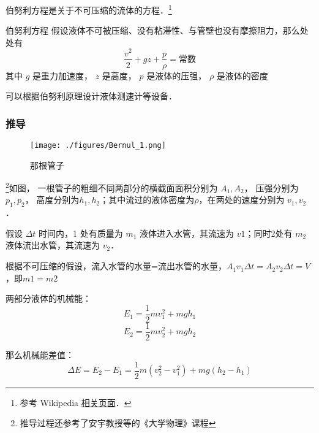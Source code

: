 

伯努利方程是关于不可压缩的流体的方程．\footnote{参考 Wikipedia \href{https://en.wikipedia.org/wiki/Bernoulli-principle}{相关页面}．}

\begin{theorem}{伯努利方程}
假设液体不可被压缩、没有粘滞性、与管壁也没有摩擦阻力，那么处处有
\begin{equation}
\frac{v^2}{2} + gz + \frac{p}{\rho} = \text{常数}
\end{equation}
其中 $g$ 是重力加速度， $z$ 是高度， $p$ 是液体的压强， $\rho$ 是液体的密度
\end{theorem}
可以根据伯努利原理设计液体测速计等设备．

\subsubsection{推导}

\begin{figure}[ht]
\centering
\texttt{[image: ./figures/Bernul\_1.png]}
\caption{那根管子} \label{Bernul_fig1}
\end{figure}
\footnote{推导过程还参考了安宇教授等的《大学物理》课程}如图， 一根管子的粗细不同两部分的横截面面积分别为 $A_1, A_2$， 压强分别为 $p_1, p_2$， 高度分别为$h_1, h_2$；其中流过的液体密度为$\rho$，在两处的速度分别为 $v_1, v_2$．

假设 $\Delta t$ 时间内，1 处有质量为 $m_1$ 液体进入水管，其流速为 $v1$；同时2处有 $m_2$ 液体流出水管，其流速为 $v_2$．

根据不可压缩的假设，流入水管的水量=流出水管的水量，$A_1v_1\Delta t=A_2v_2\Delta t=V$，即$m1=m2$

两部分液体的机械能：
\begin{equation}
E_1=\frac{1}{2}mv_1^2+mgh_1
\end{equation}
\begin{equation}
E_2=\frac{1}{2}mv_2^2+mgh_2
\end{equation}

那么机械能差值：
\begin{equation}
\Delta E = E_2 - E_1 = \frac{1}{2}m(v_2^2-v_1^2)+mg(h_2-h_1)
\end{equation}

